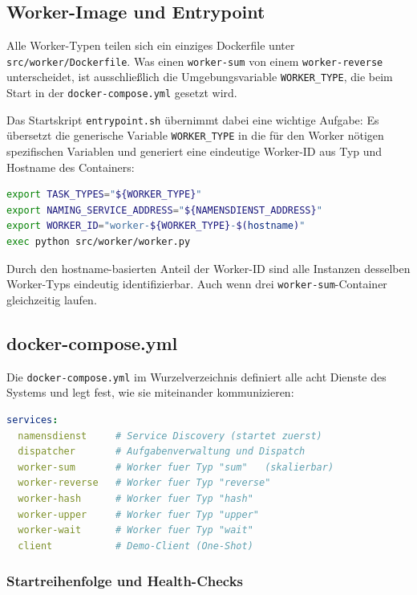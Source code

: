 \subsection{Worker-Image und Entrypoint}

Alle Worker-Typen teilen sich ein einziges Dockerfile unter \texttt{src/worker/Dockerfile}.
Was einen \texttt{worker-sum} von einem \texttt{worker-reverse} unterscheidet,
ist ausschließlich die Umgebungsvariable \texttt{WORKER\_TYPE}, die beim Start
in der \texttt{docker-compose.yml} gesetzt wird.

Das Startskript \texttt{entrypoint.sh} übernimmt dabei eine wichtige Aufgabe:
Es übersetzt die generische Variable \texttt{WORKER\_TYPE} in die für den Worker
nötigen spezifischen Variablen und generiert eine eindeutige Worker-ID aus Typ
und Hostname des Containers:

\begin{lstlisting}[language=bash,caption={Auszug aus entrypoint.sh}]
export TASK_TYPES="${WORKER_TYPE}"
export NAMING_SERVICE_ADDRESS="${NAMENSDIENST_ADDRESS}"
export WORKER_ID="worker-${WORKER_TYPE}-$(hostname)"
exec python src/worker/worker.py
\end{lstlisting}

Durch den hostname-basierten Anteil der Worker-ID sind alle Instanzen desselben
Worker-Typs eindeutig identifizierbar. Auch wenn drei \texttt{worker-sum}-Container
gleichzeitig laufen.

\subsection{docker-compose.yml}

Die \texttt{docker-compose.yml} im Wurzelverzeichnis definiert alle acht Dienste
des Systems und legt fest, wie sie miteinander kommunizieren:

\begin{lstlisting}[language=yaml,caption={Dienste in docker-compose.yml}]
services:
  namensdienst     # Service Discovery (startet zuerst)
  dispatcher       # Aufgabenverwaltung und Dispatch
  worker-sum       # Worker fuer Typ "sum"   (skalierbar)
  worker-reverse   # Worker fuer Typ "reverse"
  worker-hash      # Worker fuer Typ "hash"
  worker-upper     # Worker fuer Typ "upper"
  worker-wait      # Worker fuer Typ "wait"
  client           # Demo-Client (One-Shot)
\end{lstlisting}

\subsubsection*{Startreihenfolge und Health-Checks}

